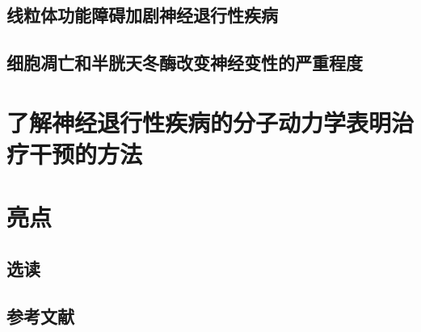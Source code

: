 \subsection{线粒体功能障碍加剧神经退行性疾病}
\subsection{细胞凋亡和半胱天冬酶改变神经变性的严重程度}

\section{了解神经退行性疾病的分子动力学表明治疗干预的方法}

\section{亮点}
\subsection{选读}
\subsection{参考文献}